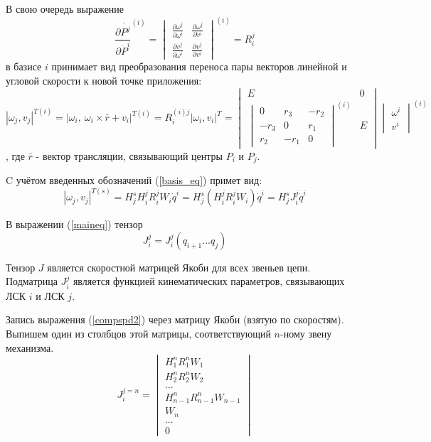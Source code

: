 \documentclass[12pt,a4paper,titlepage]{article}
\begin{document}
В свою очередь выражение
\begin{equation}\label{}
\frac{\partial{\dot{P^j}}}{\partial{\dot{P}^i}}^{(i)}
=
\begin{vmatrix}
\frac{\partial{\omega^j}}{\partial{\omega^i}} & \frac{\partial{\omega^j}}{\partial{v^i}} \\
\frac{\partial{v^j}}{\partial{\omega^i}} & \frac{\partial{v^j}}{\partial{v^i}}
\end{vmatrix}^{(i)}=R_i^j
\end{equation}
в базисе $i$ принимает вид преобразования переноса пары векторов линейной и угловой скорости к новой точке приложения:
\begin{equation}\label{}
|\omega_j, v_j|^{T(i)} = |\omega_i,\ \omega_i \times \bar{r} + v_i|^{T(i)} = R^{(i)j}_{i}|\omega_i, v_i|^T=
\begin{vmatrix}
E & 0\\
\begin{vmatrix}
0 & r_3 & -r_2\\
-r_3 & 0 & r_1\\
r_2 & -r_1 & 0
\end{vmatrix}
^{(i)} & E
\end{vmatrix}
\begin{vmatrix}
\omega^i\\
v^i
\end{vmatrix}^{(i)}
\end{equation}, где $\bar{r}$ - вектор трансляции, связывающий центры $P_i$ и $P_j$.

C учётом введенных обозначений (\ref{basis_eq}) примет вид:
\begin{equation}\label{maineq}
|\omega_j, v_j|^{T(s)} = H^s_j H^j_i R^j_i W_i \dot{q}^i = H^s_j (H^j_i R^j_i W_i) \dot{q}^i = H^s_j J^{j}_i \dot{q}^i
\end{equation}

В выражении (\ref{maineq}) тензор 
\begin{equation}\label{}
J_i^j = J_i^j(q_{i+1}...q_j)
\end{equation} 

Тензор $J$ является скоростной матрицей Якоби для всех звеньев цепи. Подматрица $J^j_i$ является функцией кинематических параметров, связывающих ЛСК $i$ и ЛСК $j$.

Запись выражения (\ref{compspd2}) через матрицу Якоби (взятую по скоростям).
Выпишем один из столбцов этой матрицы, соответствующий $n$-ному звену механизма.
\begin{equation}\label{}
J_i^{j=n} =  
\begin{vmatrix}
H^n_1R^n_1W_1 \\
H^n_2R^n_2W_2 \\
... \\
H^n_{n-1}R^n_{n-1}W_{n-1} \\
W_{n} \\
... \\
0
\end{vmatrix}
\end{equation}
\end{document}
